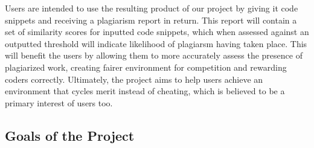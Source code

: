 \documentclass[12pt]{article}
\begin{document}
Users are intended to use the resulting product of our project by giving it
code snippets and receiving a plagiarism report in return. This report will
contain a set of similarity scores for inputted code snippets, which when 
assessed against an outputted threshold will indicate likelihood of plagiarsm
having taken place. This will benefit the users by allowing them to more 
accurately assess the presence of plagiarized work, creating fairer environment
for competition and rewarding coders correctly. Ultimately, the project aims
to help users achieve an environment that cycles merit instead of cheating, 
which is believed to be a primary interest of users too.

\subsection{Goals of the Project}
\end{document}
